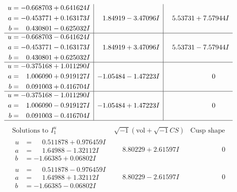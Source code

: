 \documentclass[1p]{elsarticle_modified}
\theoremstyle{definition}
\newcommand{\I}{\sqrt{-1}}
\begin{document}
$$\begin{array}{c|c|c}
\begin{aligned}
u &= -0.668703 + 0.641624 I \\
a &= -0.453771 + 0.163173 I \\
b &= \phantom{-}0.430801 - 0.625032 I\end{aligned}
 & \phantom{-}1.84919 - 3.47096 I & \phantom{-}5.53731 + 7.57944 I \\ \hline\begin{aligned}
u &= -0.668703 - 0.641624 I \\
a &= -0.453771 - 0.163173 I \\
b &= \phantom{-}0.430801 + 0.625032 I\end{aligned}
 & \phantom{-}1.84919 + 3.47096 I & \phantom{-}5.53731 - 7.57944 I \\ \hline\begin{aligned}
u &= -0.375168 + 1.011290 I \\
a &= \phantom{-}1.006090 + 0.919127 I \\
b &= \phantom{-}0.091003 + 0.416704 I\end{aligned}
 & -1.05484 - 1.47223 I & \phantom{-0.000000 } 0 \\ \hline\begin{aligned}
u &= -0.375168 - 1.011290 I \\
a &= \phantom{-}1.006090 - 0.919127 I \\
b &= \phantom{-}0.091003 - 0.416704 I\end{aligned}
 & -1.05484 + 1.47223 I & \phantom{-0.000000 } 0\\
 \hline 
 \end{array}$$\newpage$$\begin{array}{c|c|c}  
\text{Solutions to }I^u_{1}& \I (\text{vol} + \sqrt{-1}CS) & \text{Cusp shape}\\
 \hline 
\begin{aligned}
u &= \phantom{-}0.511878 + 0.976459 I \\
a &= \phantom{-}1.64988 - 1.32112 I \\
b &= -1.66385 + 0.06802 I\end{aligned}
 & \phantom{-}8.80229 + 2.61597 I & \phantom{-0.000000 } 0 \\ \hline\begin{aligned}
u &= \phantom{-}0.511878 - 0.976459 I \\
a &= \phantom{-}1.64988 + 1.32112 I \\
b &= -1.66385 - 0.06802 I\end{aligned}
 & \phantom{-}8.80229 - 2.61597 I & \phantom{-0.000000 } 0 \\ \hline\begin{aligned}

\end{aligned}
\end{array}$$
\end{document}
